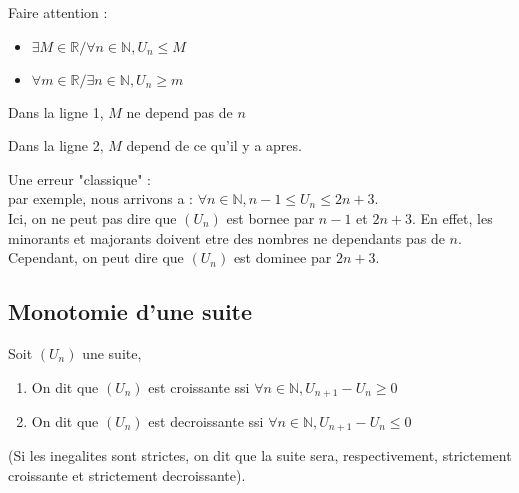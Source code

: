 \documentclass[a4paper,10pt]{book}
\begin{document}
		\newpage

		\begin{rem} Faire attention : \\
			\begin{itemize}
			\item $\exists M \in \mathbb{R} / \forall n \in \mathbb{N} , U_n \leq M$
			\item $\forall m \in \mathbb{R} / \exists n \in \mathbb{N} , U_n \geq m$
			\end{itemize}
			\begin{description}
				\item Dans la ligne 1, $M$ ne depend pas de $n$
				\item Dans la ligne 2, $M$ depend de ce qu'il y a apres.
			\end{description}

			\smallskip

			Une erreur "classique" :\\
			par exemple, nous arrivons a : $\forall n \in \mathbb{N}, n-1 \leq U_n \leq 2n+3$.\\
			Ici, on ne peut pas dire que $(U_n)$ est bornee par $n-1$ et $2n+3$. En effet, les minorants et majorants doivent etre des nombres ne dependants pas de $n$. Cependant, on peut dire que $(U_n)$ est dominee par $2n+3$.
		\end{rem}

		\subsection{Monotomie d'une suite}
		\begin{Def}
			Soit $(U_n)$ une suite,\\
			\begin{enumerate}
				\item On dit que $(U_n)$ est croissante ssi $\forall n \in \mathbb{N}, U_{n+1} - U_n \geq 0$
				\item On dit que $(U_n)$ est decroissante ssi $\forall n \in \mathbb{N}, U_{n+1} - U_n \leq 0$
			\end{enumerate}
			(Si les inegalites sont strictes, on dit que la suite sera, respectivement, strictement croissante et strictement decroissante).
		\end{Def}
\end{document}
